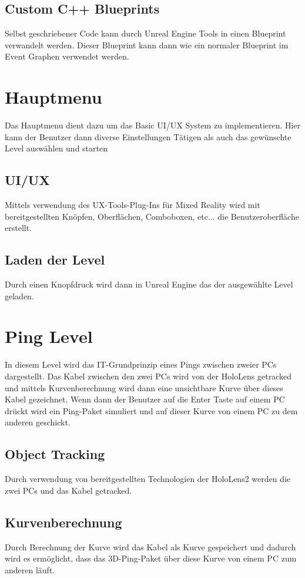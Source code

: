 \subsection{Custom C++ Blueprints}
Selbst geschriebener Code kann durch Unreal Engine Tools in einen Blueprint verwandelt werden.
Dieser Blueprint kann dann wie ein normaler Blueprint im Event Graphen verwendet werden.

\section{Hauptmenu}
Das Hauptmenu dient dazu um das Basic UI/UX System zu implementieren.
Hier kann der Benutzer dann diverse Einstellungen Tätigen als auch
das gewünschte Level auswählen und starten

\subsection{UI/UX}
Mittels verwendung des UX-Tools-Plug-Ins für Mixed Reality wird
mit bereitgestellten Knöpfen, Oberflächen, Comboboxen, etc...
die Benutzeroberfläche erstellt.

\subsection{Laden der Level}
Durch einen Knopfdruck wird dann in Unreal Engine das der ausgewählte
Level geladen.

\section{Ping Level}
In diesem Level wird das IT-Grundprinzip eines Pings zwischen zweier
PCs dargestellt. Das Kabel zwischen den zwei PCs wird von der
HoloLens getracked und mittels Kurvenberechnung wird dann eine
unsichtbare Kurve über dieses Kabel gezeichnet. Wenn dann der Benutzer
auf die Enter Taste auf einem PC drückt wird ein Ping-Paket simuliert
und auf dieser Kurve von einem PC zu dem anderen geschickt.

\subsection{Object Tracking}
Durch verwendung von bereitgestellten Technologien der HoloLens2
werden die zwei PCs und das Kabel getracked.

\subsection{Kurvenberechnung}
Durch Berechnung der Kurve wird das Kabel als Kurve gespeichert
und dadurch wird es ermöglicht, dass das 3D-Ping-Paket über diese
Kurve von einem PC zum anderen läuft.

